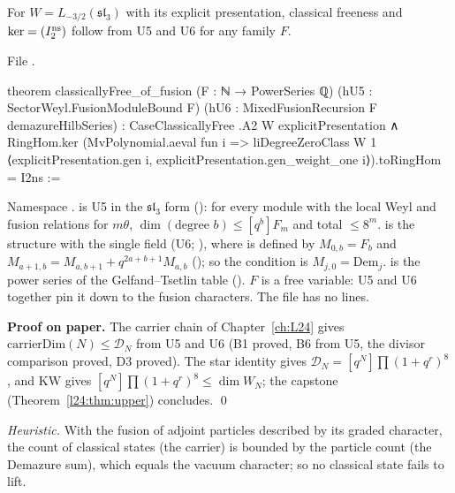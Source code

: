 \begin{theorem}\label{l27:thm:A2ladder}
For $W=L_{-3/2}(\mathfrak{sl}_3)$ with its explicit presentation, classical freeness and $\ker=(I_2^{\mathrm{ns}})$ follow from U5 and U6 for
any family $F$.
\end{theorem}
\noindent File .
\begin{leancode}
theorem classicallyFree_of_fusion (F : ℕ → PowerSeries ℚ)
    (hU5 : SectorWeyl.FusionModuleBound F)
    (hU6 : MixedFusionRecursion F demazureHilbSeries) :
    CaseClassicallyFree .A2 W explicitPresentation ∧
      RingHom.ker (MvPolynomial.aeval fun i =>
        liDegreeZeroClass W 1 ⟨explicitPresentation.gen i,
          explicitPresentation.gen_weight_one i⟩).toRingHom = I2ns :=
\end{leancode}

\begin{dictionary}
Namespace .  is U5 in the $\mathfrak{sl}_3$ form
(): for every module with the local Weyl and fusion relations for $m\theta$,
$\dim(\text{degree }b)\le[q^b]F_m$ and total $\le8^m$.  is the structure with the single field
 (U6; ), where
 is defined by $M_{0,b}=F_b$ and $M_{a+1,b}=M_{a,b+1}+q^{2a+b+1}M_{a,b}$
(); so the condition is $M_{j,0}=\mathrm{Dem}_j$.  is the power
series of the Gelfand--Tsetlin table  (). $F$ is a free variable: U5
and U6 together pin it down to the fusion characters. The file has no  lines.
\end{dictionary}

\textbf{Proof on paper.} The carrier chain of Chapter~\ref{ch:L24} gives $\mathrm{carrierDim}(N)\le\mathcal D_N$ from U5 and U6 (B1
proved, B6 from U5, the divisor comparison proved, D3 proved). The star identity gives $\mathcal D_N=[q^N]\prod(1+q^r)^8$, and KW gives
$[q^N]\prod(1+q^r)^8\le\dim W_N$; the capstone (Theorem~\ref{l24:thm:upper}) concludes. \qed

\begin{physics}
\emph{Heuristic.} With the fusion of adjoint particles described by its graded character, the count of classical states (the carrier) is
bounded by the particle count (the Demazure sum), which equals the vacuum character; so no classical state fails to lift.
\end{physics}

